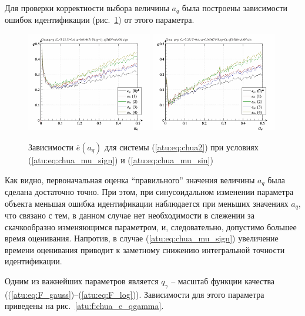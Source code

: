 Для проверки корректности выбора величины $a_q$ была построены зависимости
ошибок идентификации (рис.~\ref{atu:f:chua_e_a_q}) от этого параметра.


\begin{figure}[htb!]
  \centerline{
    \includegraphics[width=0.49\textwidth]{p/cha/chua/ql3rlWvnAAW/chua_id-p_a_q_sign.png}
    \hfill
    \includegraphics[width=0.49\textwidth]{p/cha/chua/ql3rlWvnAAW/chua_id-p_a_q_sin.png}
  }
  \caption{Зависимости  $\overline{e}(a_q)$ для системы (\ref{atu:eq:chua2})
  при условиях (\ref{atu:eq:chua_mu_sign}) и (\ref{atu:eq:chua_mu_sin})
}
\label{atu:f:chua_e_a_q}
\end{figure}

Как видно, первоначальная оценка ``правильного'' значения величины $a_q$
была сделана достаточно точно. При этом, при синусоидальном изменении параметра объекта
меньшая ошибка идентификации наблюдается при меньших значениях $a_q$, что связано
с тем, в данном случае нет необходимости в слежении за скачкообразно изменяющимся параметром,
и, следовательно, допустимо большее время оценивания. Напротив, в случае (\ref{atu:eq:chua_mu_sign})
увеличение времени оценивания приводит к заметному снижению интегральной точности идентификации.



Одним из важнейших параметров является $q_\gamma$ -- масштаб функции качества
((\ref{atu:eq:F_gauss})--(\ref{atu:eq:F_log})).
Зависимости для этого параметра приведены на рис.~\ref{atu:f:chua_e_qgamma}.

